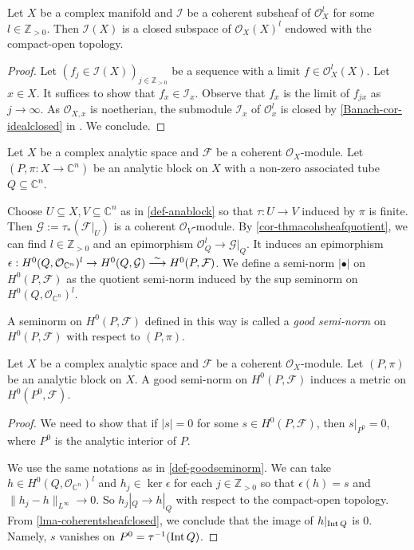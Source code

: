 \begin{lemma}\label{lma-coherentsheafclosed}
    Let $X$ be a complex manifold and $\mathcal{I}$ be a coherent subsheaf of $\mathcal{O}_X^l$ for some $l\in \mathbb{Z}_{>0}$. Then $\mathcal{I}(X)$ is a closed subspace of $\mathcal{O}_X(X)^l$ endowed with the compact-open topology.
\end{lemma}
\begin{proof}
   Let $(f_j\in \mathcal{I}(X))_{j\in \mathbb{Z}_{>0}}$ be a sequence with a limit $f\in \mathcal{O}^l_X(X)$. Let $x\in X$. It suffices to show that $f_x\in \mathcal{I}_x$. Observe that $f_x$ is the limit of $f_{jx}$ as $j\to\infty$. As $\mathcal{O}_{X,x}$ is noetherian, the submodule $\mathcal{I}_x$ of $\mathcal{O}_x^l$ is closed by \cref{Banach-cor-idealclosed} in . We conclude.
\end{proof}


\begin{definition}\label{def-goodseminorm}
    Let $X$ be a complex analytic space and $\mathcal{F}$ be a coherent $\mathcal{O}_X$-module.
Let $(P,\pi:X\rightarrow \mathbb{C}^n)$ be an analytic block on $X$ with a non-zero associated tube $Q\subseteq \mathbb{C}^n$. 

Choose $U\subseteq X,V\subseteq \mathbb{C}^n$ as in \cref{def-anablock} so that $\tau:U\rightarrow V$ induced by $\pi$ is finite. Then $\mathcal{G}:=\tau_*(\mathcal{F}|_U)$  is a coherent $\mathcal{O}_V$-module. By \cref{cor-thmacohsheafquotient}, we can find $l\in \mathbb{Z}_{>0}$ and an epimorphism $\mathcal{O}_Q^l\rightarrow \mathcal{G}|_Q$. It induces an epimorphism $\epsilon:H^0(Q,\mathcal{O}_{\mathbb{C}^n})^l\rightarrow H^0(Q,\mathcal{G})\stackrel{\sim}{\longrightarrow} H^0(P,\mathcal{F})$. We define a semi-norm $|\bullet|$ on $H^0(P,\mathcal{F})$ as the quotient semi-norm induced by the sup seminorm on $H^0(Q,\mathcal{O}_{\mathbb{C}^n})^l$. 

A seminorm on  $H^0(P,\mathcal{F})$ defined in this way is called a \emph{good semi-norm} on  $H^0(P,\mathcal{F})$ with respect to $(P,\pi)$.
\end{definition}
\begin{lemma}\label{lma-goodseminormmetric}
    Let $X$ be a complex analytic space and $\mathcal{F}$ be a coherent $\mathcal{O}_X$-module.
Let $(P,\pi)$ be an analytic block on $X$. A good semi-norm on  $H^0(P,\mathcal{F})$ induces a metric on $H^0(P^0,\mathcal{F})$.
\end{lemma}
\begin{proof}
We need to show that if $|s|=0$ for some $s\in H^0(P,\mathcal{F})$, then $s|_{P^0}=0$, where $P^0$ is the analytic interior of $P$. 

We use the same notations as in \cref{def-goodseminorm}.
We can take $h\in H^0(Q,\mathcal{O}_{\mathbb{C}^n})^l$ and $h_j\in \ker \epsilon$ for each $j\in \mathbb{Z}_{>0}$ so that $\epsilon(h)=s$ and $\|h_j-h\|_{L^{\infty}}\to 0$. So $h_j|_Q\to h|_Q$ with respect to the compact-open topology. From  \cref{lma-coherentsheafclosed}, we conclude that the image of $h|_{\operatorname{Int} Q}$ is $0$. Namely, $s$ vanishes on $P^0=\tau^{-1}(\operatorname{Int} Q)$.
\end{proof}


